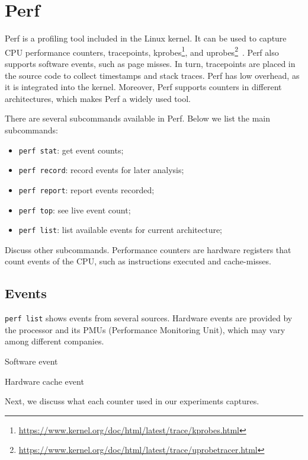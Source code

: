 \section{Perf}

Perf is a profiling tool included in the Linux kernel. It can be used to capture CPU performance counters, tracepoints, kprobes\footnote{\url{https://www.kernel.org/doc/html/latest/trace/kprobes.html}}, and uprobes\footnote{\url{https://www.kernel.org/doc/html/latest/trace/uprobetracer.html}}~\cite{perf_wiki}. Perf also supports software events, such as page misses. In turn, tracepoints are placed in the source code to collect timestamps and stack traces. Perf has low overhead, as it is integrated into the kernel. Moreover, Perf supports counters in different architectures, which makes Perf a widely used tool.

There are several subcommands available in Perf. Below we list the main subcommands:

\begin{itemize}
	\item \texttt{perf stat}: get event counts;
	\item \texttt{perf record}: record events for later analysis;
	\item \texttt{perf report}: report events recorded;
	\item \texttt{perf top}: see live event count;
	\item \texttt{perf list}: list available events for current architecture;
\end{itemize}

Discuss other subcommands.
Performance counters are hardware registers that count events of the CPU, such as instructions executed and cache-misses.

\subsection{Events}

\texttt{perf list} shows events from several sources. Hardware events are provided by the processor and its PMUs (Performance Monitoring Unit), which may vary among different companies.

Software event

Hardware cache event

Next, we discuss what each counter used in our experiments captures.

